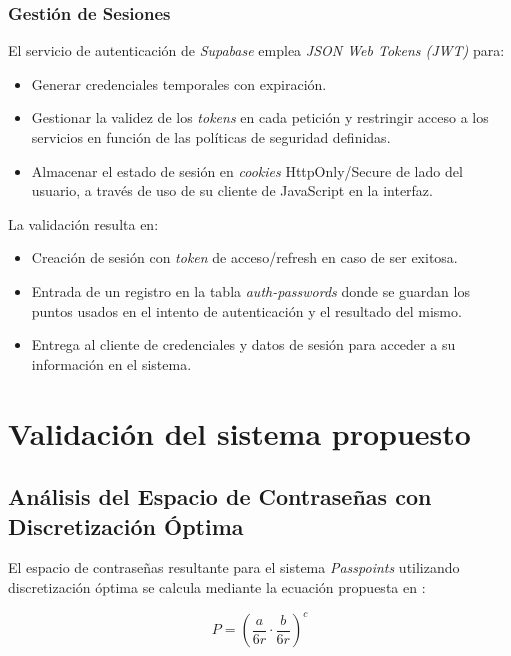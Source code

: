 \subsubsection{Gestión de Sesiones}
El servicio de autenticación de \textit{Supabase}  emplea \textit{JSON Web Tokens (JWT)} para:

\begin{itemize}
	\item Generar credenciales temporales con expiración.
	\item Gestionar la validez de los \textit{tokens} en cada petici\'on y restringir acceso a los servicios en funci\'on de las pol\'iticas de seguridad definidas.
	\item Almacenar el estado de sesión en \textit{cookies} HttpOnly/Secure de lado del usuario, a trav\'es de uso de su cliente de JavaScript en la interfaz.
\end{itemize}

La validación resulta en:
\begin{itemize}
	\item Creación de sesión con \textit{token} de acceso/refresh en caso de ser exitosa.
	\item Entrada de un registro en la tabla \textit{auth-passwords} donde se guardan los puntos usados en el intento de autenticaci\'on y el resultado del mismo.
	\item Entrega al cliente de credenciales y datos de sesi\'on para acceder a su informaci\'on en el sistema.
\end{itemize}

\section{Validaci\'on del sistema propuesto}

\subsection{Análisis del Espacio de Contraseñas con Discretización Óptima}
\label{subsec:espacio-contrasenas}

El espacio de contraseñas resultante para el sistema \textit{Passpoints} utilizando discretización óptima se calcula mediante la ecuación propuesta en \cite{birget2006graphical}:

\begin{equation}
	P = \left( \frac{a}{6r} \cdot \frac{b}{6r} \right)^c
	\label{eq:espacio-contrasenas}
\end{equation}

